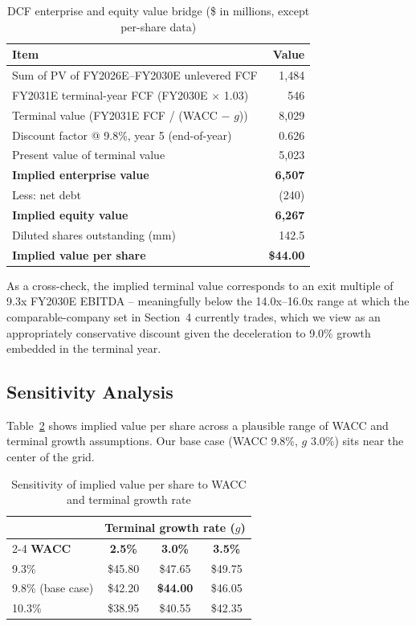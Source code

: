 \begin{table}[H]
\centering
\small
\caption{DCF enterprise and equity value bridge (\$ in millions, except per-share data)}
\label{tab:dcf-summary}
\begin{tabular}{@{}lr@{}}
\toprule
\textbf{Item} & \textbf{Value} \\
\midrule
Sum of PV of FY2026E--FY2030E unlevered FCF & 1,484 \\
FY2031E terminal-year FCF (FY2030E $\times$ 1.03) & 546 \\
Terminal value (FY2031E FCF / (WACC $-$ $g$)) & 8,029 \\
Discount factor @ 9.8\%, year 5 (end-of-year) & 0.626 \\
Present value of terminal value & 5,023 \\
\midrule
\textbf{Implied enterprise value} & \textbf{6,507} \\
Less: net debt & (240) \\
\midrule
\textbf{Implied equity value} & \textbf{6,267} \\
Diluted shares outstanding (mm) & 142.5 \\
\midrule
\textbf{Implied value per share} & \textbf{\$44.00} \\
\bottomrule
\end{tabular}
\end{table}

As a cross-check, the implied terminal value corresponds to an exit multiple of 9.3x FY2030E EBITDA -- meaningfully below the 14.0x--16.0x range at which the comparable-company set in Section~4 currently trades, which we view as an appropriately conservative discount given the deceleration to 9.0\% growth embedded in the terminal year.

\subsection{Sensitivity Analysis}

Table~\ref{tab:sensitivity} shows implied value per share across a plausible range of WACC and terminal growth assumptions. Our base case (WACC 9.8\%, $g$ 3.0\%) sits near the center of the grid.

\begin{table}[H]
\centering
\small
\caption{Sensitivity of implied value per share to WACC and terminal growth rate}
\label{tab:sensitivity}
\begin{tabular}{@{}lccc@{}}
\toprule
& \multicolumn{3}{c}{\textbf{Terminal growth rate ($g$)}} \\
\cmidrule(l){2-4}
\textbf{WACC} & \textbf{2.5\%} & \textbf{3.0\%} & \textbf{3.5\%} \\
\midrule
9.3\% & \$45.80 & \$47.65 & \$49.75 \\
9.8\% (base case) & \$42.20 & \cellcolor{signalgold!20}\textbf{\$44.00} & \$46.05 \\
10.3\% & \$38.95 & \$40.55 & \$42.35 \\
\bottomrule
\end{tabular}
\end{table}
